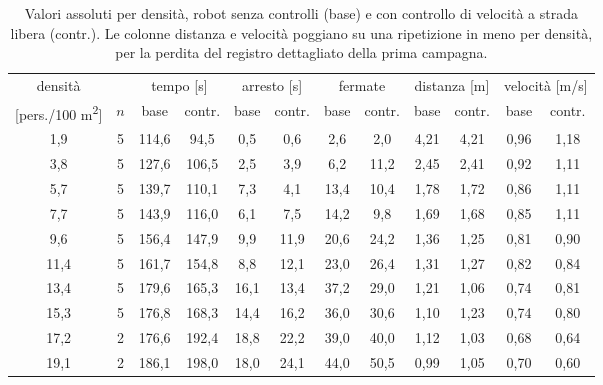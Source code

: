 
\begin{table}[h]
\centering
\footnotesize
\begin{tabular}{cc|cc|cc|cc|cc|cc}
\hline
densità & & \multicolumn{2}{c|}{tempo [s]} & \multicolumn{2}{c|}{arresto [s]} & \multicolumn{2}{c|}{fermate} & \multicolumn{2}{c|}{distanza [m]} & \multicolumn{2}{c}{velocità [m/s]} \\
{[}pers./100 m\textsuperscript{2}] & $n$ & base & contr. & base & contr. & base & contr. & base & contr. & base & contr. \\
\hline
1{,}9 & 5 & 114{,}6 & 94{,}5 & 0{,}5 & 0{,}6 & 2{,}6 & 2{,}0 & 4{,}21 & 4{,}21 & 0{,}96 & 1{,}18 \\
3{,}8 & 5 & 127{,}6 & 106{,}5 & 2{,}5 & 3{,}9 & 6{,}2 & 11{,}2 & 2{,}45 & 2{,}41 & 0{,}92 & 1{,}11 \\
5{,}7 & 5 & 139{,}7 & 110{,}1 & 7{,}3 & 4{,}1 & 13{,}4 & 10{,}4 & 1{,}78 & 1{,}72 & 0{,}86 & 1{,}11 \\
7{,}7 & 5 & 143{,}9 & 116{,}0 & 6{,}1 & 7{,}5 & 14{,}2 & 9{,}8 & 1{,}69 & 1{,}68 & 0{,}85 & 1{,}11 \\
9{,}6 & 5 & 156{,}4 & 147{,}9 & 9{,}9 & 11{,}9 & 20{,}6 & 24{,}2 & 1{,}36 & 1{,}25 & 0{,}81 & 0{,}90 \\
11{,}4 & 5 & 161{,}7 & 154{,}8 & 8{,}8 & 12{,}1 & 23{,}0 & 26{,}4 & 1{,}31 & 1{,}27 & 0{,}82 & 0{,}84 \\
13{,}4 & 5 & 179{,}6 & 165{,}3 & 16{,}1 & 13{,}4 & 37{,}2 & 29{,}0 & 1{,}21 & 1{,}06 & 0{,}74 & 0{,}81 \\
15{,}3 & 5 & 176{,}8 & 168{,}3 & 14{,}4 & 16{,}2 & 36{,}0 & 30{,}6 & 1{,}10 & 1{,}23 & 0{,}74 & 0{,}80 \\
17{,}2 & 2 & 176{,}6 & 192{,}4 & 18{,}8 & 22{,}2 & 39{,}0 & 40{,}0 & 1{,}12 & 1{,}03 & 0{,}68 & 0{,}64 \\
19{,}1 & 2 & 186{,}1 & 198{,}0 & 18{,}0 & 24{,}1 & 44{,}0 & 50{,}5 & 0{,}99 & 1{,}05 & 0{,}70 & 0{,}60 \\
\hline
\end{tabular}
\caption{Valori assoluti per densità, robot senza controlli (base) e con controllo di velocità a strada libera (contr.). Le colonne distanza e velocità poggiano su una ripetizione in meno per densità, per la perdita del registro dettagliato della prima campagna.}
\label{tab:velocita-assoluti}
\end{table}

